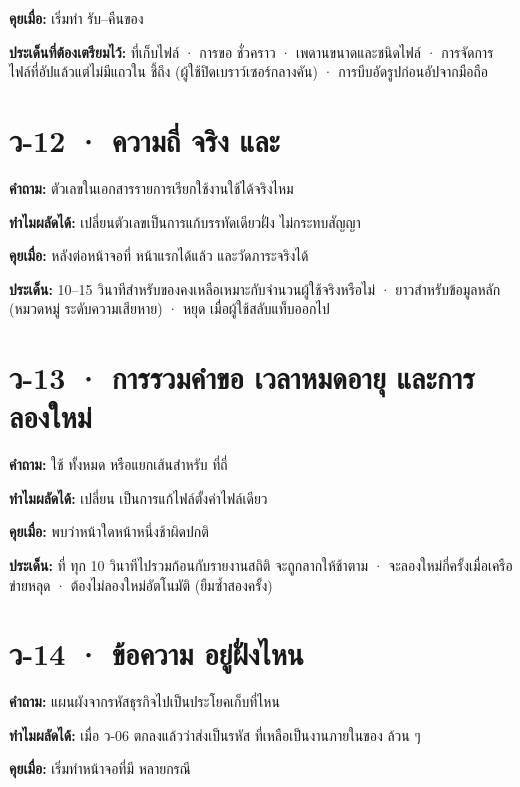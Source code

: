 \textbf{คุยเมื่อ:} เริ่มทำ  รับ--คืนของ

\textbf{ประเด็นที่ต้องเตรียมไว้:} ที่เก็บไฟล์ · การขอ  ชั่วคราว ·
เพดานขนาดและชนิดไฟล์ · การจัดการไฟล์ที่อัปแล้วแต่ไม่มีแถวใน  ชี้ถึง
(ผู้ใช้ปิดเบราว์เซอร์กลางคัน) · การบีบอัดรูปก่อนอัปจากมือถือ

\section{ว-12 · ความถี่  จริง และ }

\textbf{คำถาม:} ตัวเลขในเอกสารรายการเรียกใช้งานใช้ได้จริงไหม

\textbf{ทำไมผลัดได้:} เปลี่ยนตัวเลขเป็นการแก้บรรทัดเดียวฝั่ง 
ไม่กระทบสัญญา

\textbf{คุยเมื่อ:} หลังต่อหน้าจอที่  หน้าแรกได้แล้ว และวัดภาระจริงได้

\textbf{ประเด็น:} 10--15 วินาทีสำหรับของคงเหลือเหมาะกับจำนวนผู้ใช้จริงหรือไม่ ·
 ยาวสำหรับข้อมูลหลัก (หมวดหมู่  ระดับความเสียหาย) ·
หยุด  เมื่อผู้ใช้สลับแท็บออกไป

\section{ว-13 · การรวมคำขอ เวลาหมดอายุ และการลองใหม่}

\textbf{คำถาม:} ใช้  ทั้งหมด หรือแยกเส้นสำหรับ  ที่ถี่

\textbf{ทำไมผลัดได้:} เปลี่ยน  เป็นการแก้ไฟล์ตั้งค่าไฟล์เดียว

\textbf{คุยเมื่อ:} พบว่าหน้าใดหน้าหนึ่งช้าผิดปกติ

\textbf{ประเด็น:}  ที่  ทุก 10 วินาทีไปรวมก้อนกับรายงานสถิติ
จะถูกลากให้ช้าตาม · จะลองใหม่กี่ครั้งเมื่อเครือข่ายหลุด · 
ต้องไม่ลองใหม่อัตโนมัติ (ยืมซ้ำสองครั้ง)

\section{ว-14 · ข้อความ  อยู่ฝั่งไหน}

\textbf{คำถาม:} แผนผังจากรหัสธุรกิจไปเป็นประโยคเก็บที่ไหน

\textbf{ทำไมผลัดได้:} เมื่อ ว-06 ตกลงแล้วว่าส่งเป็นรหัส ที่เหลือเป็นงานภายในของ
 ล้วน ๆ

\textbf{คุยเมื่อ:} เริ่มทำหน้าจอที่มี  หลายกรณี

